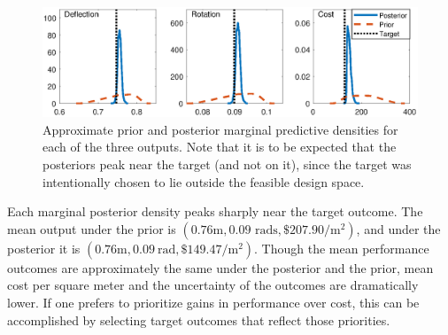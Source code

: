 \documentclass[12pt]{article}
\begin{document}
\begin{figure}[tb]
\centering
\includegraphics[scale=0.8]{FIG_prior_vs_posterior_dist}
\caption{Approximate prior and posterior marginal predictive densities for each of the three outputs. Note that it is to be expected that the posteriors peak near the target (and not on it), since the target was intentionally chosen to lie outside the feasible design space.}
\label{fig:prior_post_pred_comp}
\end{figure}
%
Each marginal posterior density peaks sharply near the target outcome.
%
The mean output under the prior is $(0.76\mathrm m,0.09\text{ rads},\$207.90/\mathrm m^2)$, and under the posterior it is $(0.76\mathrm m,0.09\ \mathrm{rad},\$149.47/\mathrm m^2)$.
%
Though the mean performance outcomes are approximately the same under the posterior and the prior, mean cost per square meter and the uncertainty of the outcomes are dramatically lower.
%
If one prefers to prioritize gains in performance over cost, this can be accomplished by selecting target outcomes that reflect those priorities.
\end{document}

